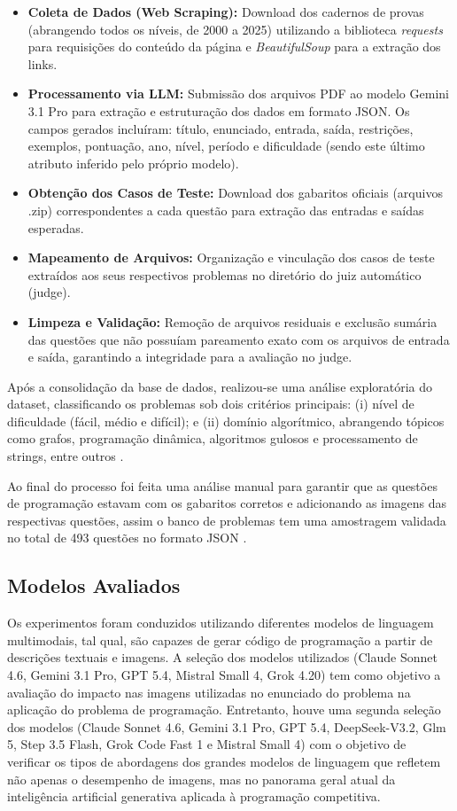 \documentclass[12pt]{article}
\begin{document}
\begin{itemize}
    \item \textbf{Coleta de Dados (Web Scraping):} Download dos cadernos de provas (abrangendo todos os níveis, de 2000 a 2025) utilizando a biblioteca \textit{requests} para requisições do conteúdo da página e \textit{BeautifulSoup} para a extração dos links.
    \item \textbf{Processamento via LLM:} Submissão dos arquivos PDF ao modelo Gemini 3.1 Pro para extração e estruturação dos dados em formato JSON. Os campos gerados incluíram: título, enunciado, entrada, saída, restrições, exemplos, pontuação, ano, nível, período e dificuldade (sendo este último atributo inferido pelo próprio modelo).
    \item \textbf{Obtenção dos Casos de Teste:} Download dos gabaritos oficiais (arquivos .zip) correspondentes a cada questão para extração das entradas e saídas esperadas.
    \item \textbf{Mapeamento de Arquivos:} Organização e vinculação dos casos de teste extraídos aos seus respectivos problemas no diretório do juiz automático (judge).
    \item \textbf{Limpeza e Validação:} Remoção de arquivos residuais e exclusão sumária das questões que não possuíam pareamento exato com os arquivos de entrada e saída, garantindo a integridade para a avaliação no judge.
\end{itemize}

Após a consolidação da base de dados, realizou-se uma análise exploratória do dataset, classificando os problemas sob dois critérios principais: (i) nível de dificuldade (fácil, médio e difícil); e (ii) domínio algorítmico, abrangendo tópicos como grafos, programação dinâmica, algoritmos gulosos e processamento de strings, entre outros \cite{obi2026}.

Ao final do processo foi feita uma análise manual para garantir que as questões de programação estavam com os gabaritos corretos e adicionando as imagens das respectivas questões, assim o banco de problemas tem uma amostragem validada no total de 493 questões no formato JSON \cite{anonimo2026}.

\subsection{Modelos Avaliados}

Os experimentos foram conduzidos utilizando diferentes modelos de linguagem multimodais, tal qual, são capazes de gerar código de programação a partir de descrições textuais e imagens. A seleção dos modelos utilizados (Claude Sonnet 4.6, Gemini 3.1 Pro, GPT 5.4, Mistral Small 4, Grok 4.20) tem como objetivo a avaliação do impacto nas imagens utilizadas no enunciado do problema na aplicação do problema de programação. Entretanto, houve uma segunda seleção dos modelos (Claude Sonnet 4.6, Gemini 3.1 Pro, GPT 5.4, DeepSeek-V3.2, Glm 5, Step 3.5 Flash, Grok Code Fast 1 e Mistral Small 4) com o objetivo de verificar os tipos de abordagens dos grandes modelos de linguagem que refletem não apenas o desempenho de imagens, mas no panorama geral atual da inteligência artificial generativa aplicada à programação competitiva.
\end{document}
